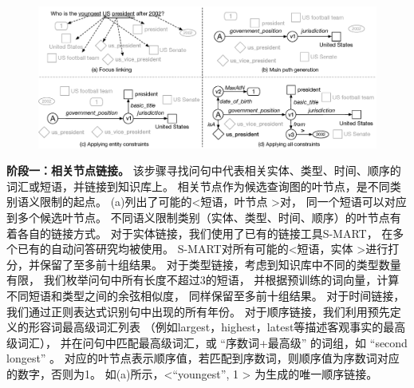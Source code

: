 \begin{figure}
	\centering
    \includegraphics[width=1\columnwidth]{figure/compqa/cangen.eps}
	\label{fig:compqa-candgen}
\end{figure}


\textbf{阶段一：相关节点链接。}%
该步骤寻找问句中代表相关实体、类型、时间、顺序的词汇或短语，并链接到知识库上。
相关节点作为候选查询图的叶节点，是不同类别语义限制的起点。
(a)列出了可能的\textless 短语，叶节点 \textgreater 对，
同一个短语可以对应到多个候选叶节点。
不同语义限制类别（实体、类型、时间、顺序）的叶节点有着各自的链接方式。
对于实体链接，我们使用了已有的链接工具S-MART\cite{yang2015s}，
在多个已有的自动问答研究均被使用。
S-MART对所有可能的\textless 短语，实体 \textgreater 进行打分，并保留了至多前十组结果。
对于类型链接，考虑到知识库中不同的类型数量有限，
我们枚举问句中所有长度不超过3的短语，
并根据预训练的词向量，计算不同短语和类型之间的余弦相似度，
同样保留至多前十组结果。
对于时间链接，我们通过正则表达式识别句中出现的所有年份。
对于顺序链接，我们利用预先定义的形容词最高级词汇列表
（例如largest，highest，latest等描述客观事实的最高级词汇），
并在问句中匹配最高级词汇，或 ``{序数词+最高级}'' 的词组，如 ``second longest'' 。
对应的叶节点表示顺序值，若匹配到序数词，则顺序值为序数词对应的数字，否则为1。
如(a)所示，\textless ``youngest'', 1 \textgreater
为生成的唯一顺序链接。

